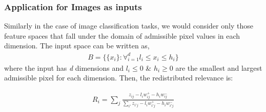 \documentclass{article}
\begin{document}
	\subsubsection*{Application for Images as inputs}
	Similarly in the case of image classification tasks, we would consider only those feature spaces that fall under the domain of admissible pixel values in each dimension. The input space can be written as,
	\begin{align}
		B = \{ \{ x_i\}: \forall_{i=1}^{d} l_i \leq x_i \leq h_i \} \nonumber 
	\end{align}
	where the input has \textit{d} dimensions and $l_i \leq 0$ \& $h_i \geq 0$ are the smallest and largest admissible pixel for each dimension. Then, the redistributed relevance is: 
	
	\begin{align}
		R_i = \sum_j \frac{z_{ij} - l_i w_{ij}^{+} - h_i w_{ij}^{-} }{\sum_{i'}z_{i'j} - l_i w_{i'j}^{+} - h_i w_{i'j}^{-} }
	\end{align}
	

	
	
\end{document}
